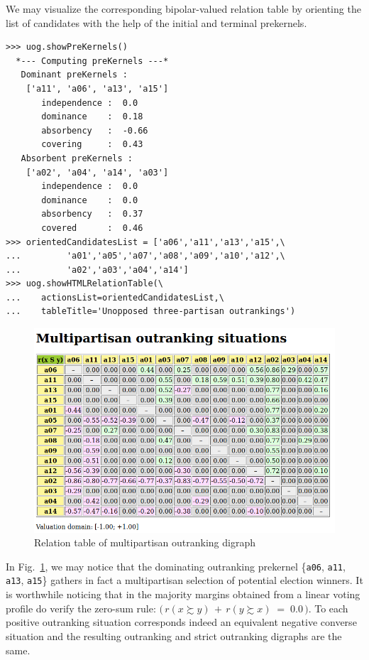 We may visualize the corresponding bipolar-valued relation table by orienting the list of candidates with the help of the initial and terminal prekernels.
\begin{lstlisting}[caption={Computing unopposed multiobjective outranking situations},label=list:20.4]
>>> uog.showPreKernels()
  *--- Computing preKernels ---*
   Dominant preKernels :
    ['a11', 'a06', 'a13', 'a15']
       independence :  0.0
       dominance    :  0.18
       absorbency   :  -0.66
       covering     :  0.43
   Absorbent preKernels :
    ['a02', 'a04', 'a14', 'a03']
       independence :  0.0
       dominance    :  0.0
       absorbency   :  0.37
       covered      :  0.46
>>> orientedCandidatesList = ['a06','a11','a13','a15',\
...         'a01','a05','a07','a08','a09','a10','a12',\
...         'a02','a03','a04','a14']
>>> uog.showHTMLRelationTable(\
...    actionsList=orientedCandidatesList,\
...    tableTitle='Unopposed three-partisan outrankings')
\end{lstlisting}
\begin{figure}[h]
\includegraphics[width=12cm]{Figures/20-1-unOpposedOutrankings.png}
\caption{Relation table of multipartisan outranking digraph} 
\label{fig:20.1}       %
\end{figure}

In Fig.~\ref{fig:20.1}, we may notice that the dominating outranking prekernel \{\texttt{a06}, \texttt{a11}, \texttt{a13}, \texttt{a15}\} gathers in fact a multipartisan selection of potential election winners. It is worthwhile noticing that in the majority margins obtained from a linear voting profile do verify the zero-sum rule: $\big(\,r(x \succsim y) \,+\, r(y \succsim x) \;=\; 0.0\,\big)$. To each positive outranking situation corresponds indeed an equivalent negative converse situation and the resulting outranking and strict outranking digraphs are the same.

